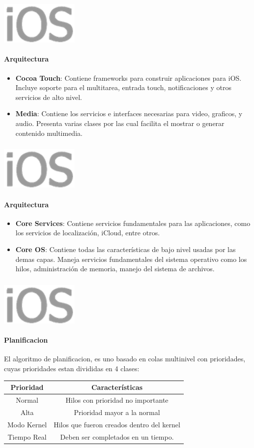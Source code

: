 \documentclass{beamer}
\newcommand*{\ioslogo}{\includegraphics[scale=0.25]{img/logo2.png} \ }%
\begin{document}
\begin{frame}
	\frametitle{\ioslogo}
	\framesubtitle{Arquitectura}
	
	\begin{itemize}
		\item{
			\textbf{Cocoa Touch}: Contiene frameworks para construir aplicaciones para iOS. Incluye soporte para el multitarea, entrada touch, notificaciones y otros servicios de alto nivel.
		}
		\vspace{1cm}
		\item{
			\textbf{Media}: Contiene los servicios e interfaces necesarias para video, graficos, y audio. Presenta varias clases por las cual facilita el mostrar o generar contenido multimedia.
		}
	\end{itemize}
\end{frame}

\begin{frame}
	\frametitle{\ioslogo}
	\framesubtitle{Arquitectura}
	
	\begin{itemize}
		\item{
			\textbf{Core Services}: Contiene servicios fundamentales para las aplicaciones, como los servicios de localización, iCloud, entre otros.
		}
		\vspace{1cm}
		\item{
			\textbf{Core OS}: Contiene todas las características de bajo nivel usadas por las demas capas. Maneja servicios fundamentales del sistema operativo como los hilos, administración de memoria, manejo del sistema de archivos.
		}
	\end{itemize}
\end{frame}



\begin{frame}
\frametitle{\ioslogo}
\framesubtitle{Planificacion}
	El algoritmo de planificacion, es uno basado en colas multinivel con prioridades, cuyas prioridades estan divididas en 4 clases:
	
	\vspace{1cm}
	\centering
	\begin{tabular}{|c|c|} \hline
		Prioridad & Características \\ \hline\hline
		Normal & Hilos con prioridad no importante \\ \hline
		Alta & Prioridad mayor a la normal \\ \hline
		Modo Kernel & Hilos que fueron creados dentro del kernel \\ \hline
		Tiempo Real & Deben ser completados en un tiempo.\\ \hline
	\end{tabular}
\end{frame}
\end{document}
